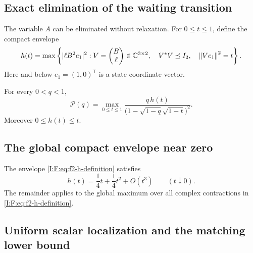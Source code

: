 \subsection{Exact elimination of the waiting transition}

The variable $A$ can be eliminated without relaxation.  For $0\le t\le1$,
define the compact envelope
\begin{equation}
 h(t)=\max\left\{
  |\ell B^2e_1|^2:
  V=\begin{pmatrix}B\\\ell\end{pmatrix}\in\mathbb C^{3\times2},\quad
  V^*V\preceq I_2,\quad\left\lVert Ve_1\right\rVert^2=t
 \right\}.
 \label{I:F:eq:f2-h-definition}
\end{equation}
Here and below $e_1=(1,0)^{\mathsf T}$ is a state coordinate vector.

\begin{lemma}
\label{I:F:lem:f2-A-elimination}
For every $0<q<1$,
\begin{equation}
 \mathcal P(q)=
 \max_{0\le t\le1}
 \frac{q\,h(t)}{\bigl(1-\sqrt{1-q}\sqrt{1-t}\bigr)^2}.
 \label{I:F:eq:f2-scalar-reduction}
\end{equation}
Moreover $0\le h(t)\le t$.
\end{lemma}



\subsection{The global compact envelope near zero}

\begin{lemma}
\label{I:F:lem:f2-h-expansion}
The envelope \eqref{I:F:eq:f2-h-definition} satisfies
\begin{equation}
 h(t)=\frac14t+\frac14t^2+O(t^3)
 \qquad(t\downarrow0).
 \label{I:F:eq:f2-h-expansion}
\end{equation}
The remainder applies to the global maximum over all complex
contractions in \eqref{I:F:eq:f2-h-definition}.
\end{lemma}



\subsection{Uniform scalar localization and the matching lower bound}

